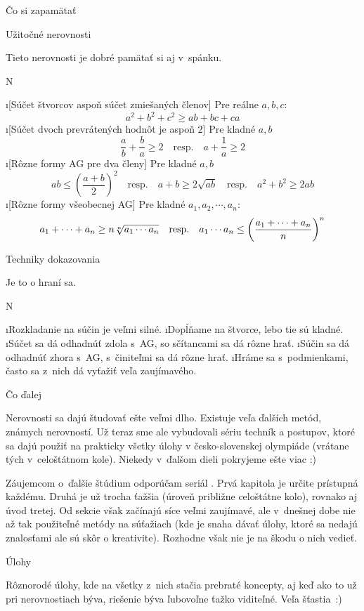 \sec Čo si zapamätať

\secc Užitočné nerovnosti

Tieto nerovnosti je dobré pamätať si aj v~spánku.

\begitems \style N

\i [Súčet štvorcov aspoň súčet zmiešaných členov] Pre reálne $a,b,c$: 
$$
a^2+b^2+c^2 \ge ab+bc+ca
$$
\i [Súčet dvoch prevrátených hodnôt je aspoň $2$] Pre kladné $a,b$
$$
\frac ab + \frac ba \ge 2  \quad\text{resp.}\quad a + \frac 1a \ge 2
$$
\i [Rôzne formy AG pre dva členy] Pre kladné $a,b$
$$
ab \leq \left(\frac{a+b}{2}\right)^2 \quad\text{resp.}\quad
a+b \ge 2\sqrt{ab} \quad\text{resp.}\quad
a^2+b^2 \ge 2ab
$$
\i [Rôzne formy všeobecnej AG] Pre kladné $a_1,a_2,\cdots,a_n$:
$$
a_1+\cdots+a_n \ge n \root n \of {a_1\cdots a_n}  \quad\text{resp.}\quad
a_1 \cdots a_n \leq \left(\frac{a_1+\cdots+a_n}{n}\right)^n
$$
\enditems 

\secc Techniky dokazovania

Je to o hraní sa.

\begitems \style N

\i Rozkladanie na súčin je veľmi silné.
\i Dopĺňame na štvorce, lebo tie sú kladné.
\i Súčet sa dá odhadnúť zdola s~AG, so sčítancami sa dá rôzne hrať.
\i Súčin sa dá odhadnúť zhora s~AG, s~činiteľmi sa dá rôzne hrať.
\i Hráme sa s~podmienkami, často sa z~nich dá vyťažiť veľa zaujímavého.

\enditems 

\sec Čo ďalej

Nerovnosti sa dajú študovať ešte veľmi dlho. Existuje veľa ďalších metód, známych nerovností. Už teraz sme ale vybudovali sériu techník a postupov, ktoré sa dajú použiť na prakticky všetky úlohy v česko-slovenskej olympiáde (vrátane tých v~celoštátnom kole). Niekedy v~ďalšom dieli pokryjeme ešte viac :)

Záujemcom o~ďalšie štúdium odporúčam  seriál . Prvá kapitola je určite prístupná každému. Druhá je už trocha ťažšia (úroveň približne celoštátne kolo), rovnako aj úvod tretej. Od sekcie  však začínajú síce veľmi zaujímavé, ale v~dnešnej dobe nie až tak použiteľné metódy na súťažiach (kde je snaha dávať úlohy, ktoré sa nedajú  znalosťami ale sú skôr o kreativite). Rozhodne však nie je na škodu o nich vedieť.

\sec Úlohy

Rôznorodé úlohy, kde na všetky z~nich stačia prebraté koncepty, aj keď ako to už pri nerovnostiach býva, riešenie býva ľubovoľne ťažko viditeľné. Veľa šťastia~:)

